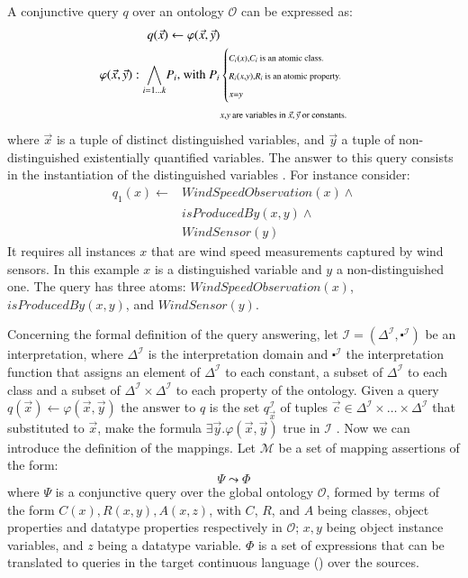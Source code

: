 A conjunctive query $q$ over an ontology $\mathcal{O}$ can be expressed as:
\begin{align*}
q(\vec{x}) \leftarrow \varphi(\vec{x},\vec{y}) \\
%
\varphi(\vec{x},\vec{y}):\underset{i=1...k}{\bigwedge}P_i \mbox{, with } P_i &
\begin{cases} 
{\scriptstyle C_i(x), C_i\: \mbox{\scriptsize is an atomic class.} }\\ 
{\scriptstyle R_i(x,y),   R_i\: \mbox{\scriptsize is an atomic property.} }\\ 
{\scriptstyle x=y}
\end{cases} \\
& {\scriptstyle x,y\: \mbox{\scriptsize are variables in $\vec{x}, \vec{y}$ or constants.}}
\end{align*}
%
where $\vec{x}$ is a tuple of distinct distinguished variables, and $\vec{y}$ a tuple of non-distinguished existentially quantified variables. 
The answer to this query consists in the instantiation of the distinguished variables
\cite{Calvanese_05}. 
For instance consider:
\begin{align*}
q_1(x) \leftarrow & WindSpeedObservation(x)\wedge \\
						& isProducedBy(x,y)\wedge\\
						& WindSensor(y)
\end{align*}
It requires all instances $x$ that are wind speed measurements captured by wind sensors.
In this example $x$ is a distinguished variable and $y$ a non-distinguished one. 
The query has three atoms: $WindSpeedObservation(x)$, $isProducedBy(x,y)$, and $WindSensor(y)$.

Concerning the formal definition of the query answering, let $\mathcal{I}=(\Delta^\mathcal{I} ,\centerdot^\mathcal{I})$ be an interpretation, where $\Delta^\mathcal{I}$ is the interpretation domain and $\centerdot^\mathcal{I}$ the interpretation function that assigns an element of $\Delta^\mathcal{I}$ to each constant, a subset of $\Delta^\mathcal{I}$ to each class and a subset of $\Delta^\mathcal{I} \times \Delta^\mathcal{I}$ to each property of the ontology.
Given a query $q(\vec{x})\leftarrow \varphi(\vec{x},\vec{y})$ the answer to $q$ is the set $q^{\mathcal{I}}_{\vec{x}}$ of tuples $\vec{c} \in \Delta^\mathcal{I} \times \dots \times \Delta^\mathcal{I}$ that substituted to $\vec{x}$, make the formula $\exists\vec{y}.\varphi(\vec{x},\vec{y})$ true in $\mathcal{I}$ \cite{Calvanese_05,Poggi_08,Lubyte_09}.
Now we can introduce the definition of the mappings. 
Let $\mathcal{M}$ be a set of mapping assertions of the form:
\begin{equation*}
\Psi \leadsto \Phi
\end{equation*}
where $\Psi$ is a conjunctive query over the global ontology $\mathcal{O}$, formed by terms of the form $C(x), R(x,y), A(x,z)$, with $C$, $R$, and $A$ being classes, object properties and datatype properties respectively in $\mathcal{O}$; $x, y$ being object instance variables, and $z$ being a datatype variable. 
$\Phi$ is a set of expressions that can be translated to queries in the target continuous language (\eg \sneeql) over the sources.

